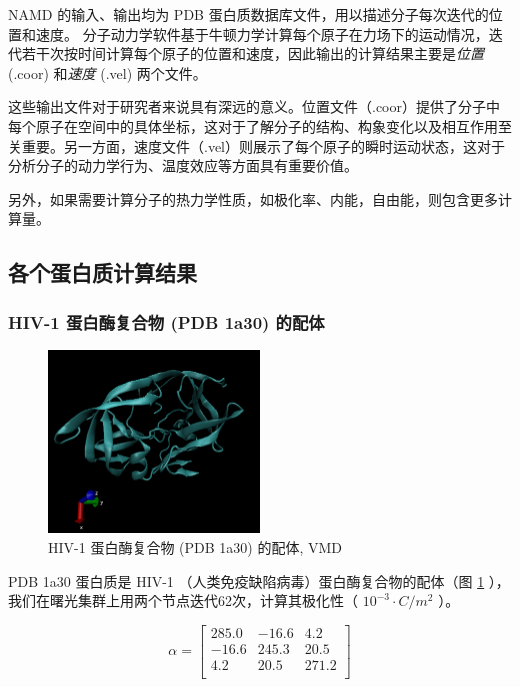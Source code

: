 NAMD 的输入、输出均为 PDB 蛋白质数据库文件，用以描述分子每次迭代的位置和速度。
分子动力学软件基于牛顿力学计算每个原子在力场下的运动情况，迭代若干次按时间计算每个原子的位置和速度，因此输出的计算结果主要是\textit{位置} (.coor) 和\textit{速度} (.vel) 两个文件。

这些输出文件对于研究者来说具有深远的意义。位置文件（.coor）提供了分子中每个原子在空间中的具体坐标，这对于了解分子的结构、构象变化以及相互作用至关重要。另一方面，速度文件（.vel）则展示了每个原子的瞬时运动状态，这对于分析分子的动力学行为、温度效应等方面具有重要价值。

另外，如果需要计算分子的热力学性质，如极化率、内能，自由能，则包含更多计算量。


\subsection{各个蛋白质计算结果}

\subsubsection{HIV-1 蛋白酶复合物 (PDB 1a30) 的配体}

\begin{figure}[h]
    \centering
    \includegraphics[width=0.5\textwidth]{images/1A30.png}
    \caption{HIV-1 蛋白酶复合物 (PDB 1a30) 的配体, VMD}
    \label{fig:1a30}
\end{figure}


PDB 1a30 蛋白质是 HIV-1 （人类免疫缺陷病毒）蛋白酶复合物的配体（图 \ref{fig:1a30} ），我们在曙光集群上用两个节点迭代62次，计算其极化性（ $ 10^{-3} \cdot C/m^2$ ）。


\begin{equation}
    \alpha = \begin{bmatrix}
        285.0 & -16.6 & 4.2   \\
        -16.6 & 245.3 & 20.5  \\
        4.2   & 20.5  & 271.2 \\
    \end{bmatrix}
\end{equation}



